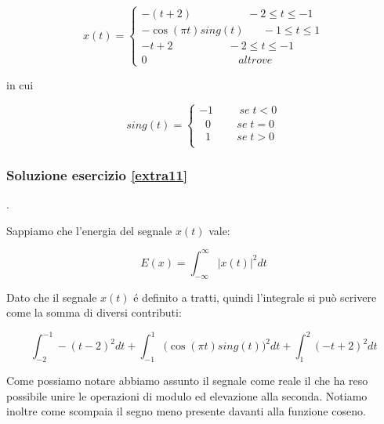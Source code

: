 \documentclass[../main.tex]{subfiles}
\begin{document}
\begin{equation*}
x(t) = \begin{cases}
	-(t+2) \hspace{60pt} -2 \leq t \leq -1\\
	-\cos(\pi t)\unit{sing}(t) \hspace{20pt} -1 \leq t \leq 1\\
	-t + 2 \hspace{60pt} -2 \leq t \leq -1\\
	0 	\hspace{100pt} \unit{altrove}
\end{cases}	
\end{equation*}

in cui

\begin{equation*}
\unit{sing}(t) = \begin{cases}
	-1 \hspace{1cm} \unit{se} \; t<0\\
	\;\;0 \hspace{1cm} \unit{se} \; t=0\\
	\;\;1 \hspace{1cm} \unit{se} \; t>0\\
\end{cases}	
\end{equation*}

\subsubsection*{Soluzione esercizio \ref{extra11}}.

Sappiamo che l’energia del segnale $x(t)$ vale:

\begin{equation}
	E(x) = \int_{-\infty}^\infty |x(t)|^2 dt
\end{equation}

Dato che il segnale $x(t)$ é definito a tratti, quindi l’integrale si può scrivere come la somma di diversi contributi:

\begin{equation}
	\int_{-2}^{-1} -(t -2)^2 dt +  \int_{-1}^1 \big(\cos(\pi t)\unit{sing}(t)\big)^2 dt + \int_{1}^{2} (-t + 2)^2 dt
\end{equation}

Come possiamo notare abbiamo assunto il segnale come reale il che ha reso possibile unire le operazioni di modulo ed elevazione alla seconda. Notiamo inoltre come scompaia il segno meno presente davanti alla funzione coseno.\\
\end{document}
